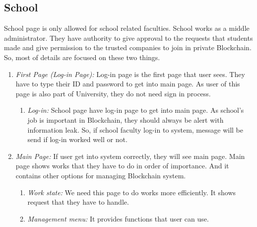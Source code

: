 \documentclass[conference]{IEEEtran}
\begin{document}
\subsection{School}
School page is only allowed for school related faculties. School works as a middle administrator. They have authority to give approval to the requests that students made and give permission to the trusted companies to join in private Blockchain. So, most of details are focused on these two things.\\
\begin{enumerate}
	\item \textit {First Page (Log-in Page):} Log-in page is the first page that user sees. They have to type their ID and password to get into main page. As user of this page is also part of University, they do not need sign in process.\\
    \begin{enumerate}
    	\item \textit {Log-in:} School page have log-in page to get into main page. As school’s job is important in Blockchain, they should always be alert with information leak. So, if school faculty log-in to system, message will be send if log-in worked well or not.\\
    \end{enumerate}
    
    \item \textit {Main Page:} If user get into system correctly, they will see main page. Main page shows works that they have to do in order of importance. And it contains other options for managing Blockchain system.\\
    \begin{enumerate}
    	\item \textit {Work state:} We need this page to do works more efficiently. It shows request that they have to handle.\\
        \item \textit {Management menu:} It provides functions that user can use.\\
    \end{enumerate}
    

\end{enumerate}
\end{document}
